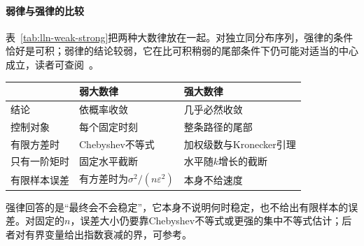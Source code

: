 \paragraph{弱律与强律的比较}
表~\ref{tab:lln-weak-strong}把两种大数律放在一起。对独立同分布序列，强律的条件恰好是可积；弱律的结论较弱，它在比可积稍弱的尾部条件下仍可能对适当的中心成立，读者可查阅~。

\begin{BookInlineTable}
 \centering
 \caption{弱大数律与强大数律（独立同分布，$\mu=\mathbb{E}[X_1]$）。}
 \label{tab:lln-weak-strong}
 \begin{tabular}{lll}
  \toprule
  & 弱大数律 & 强大数律\\
  \midrule
  结论 & 依概率收敛 & 几乎必然收敛\\
  控制对象 & 每个固定时刻 & 整条路径的尾部\\
  有限方差时 & Chebyshev不等式 & 加权级数与Kronecker引理\\
  只有一阶矩时 & 固定水平截断 & 水平随$k$增长的截断\\
  有限样本误差 & 有方差时为$\sigma^2/(n\varepsilon^2)$ & 本身不给速度\\
  \bottomrule
 \end{tabular}
\end{BookInlineTable}

强律回答的是“最终会不会稳定”，它本身不说明何时稳定，也不给出有限样本的误差。对固定的$n$，误差大小仍要靠Chebyshev不等式或更强的集中不等式估计；后者对有界变量给出指数衰减的界，可参考。
